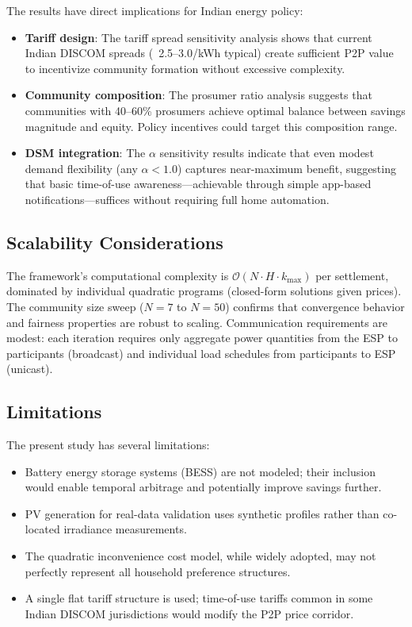 \documentclass[pdflatex,sn-mathphys-num]{sn-jnl}
\newcommand{\rupee}{\text{Rs.}}
\theoremstyle{thmstyleone}
\theoremstyle{thmstyletwo}
\begin{document}
The results have direct implications for Indian energy policy:
\begin{itemize}
    \item \textbf{Tariff design}: The tariff spread sensitivity analysis shows that current Indian DISCOM spreads (\rupee~2.5--3.0/kWh typical) create sufficient P2P value to incentivize community formation without excessive complexity.
    \item \textbf{Community composition}: The prosumer ratio analysis suggests that communities with 40--60\% prosumers achieve optimal balance between savings magnitude and equity. Policy incentives could target this composition range.
    \item \textbf{DSM integration}: The $\alpha$ sensitivity results indicate that even modest demand flexibility (any $\alpha < 1.0$) captures near-maximum benefit, suggesting that basic time-of-use awareness---achievable through simple app-based notifications---suffices without requiring full home automation.
\end{itemize}

\subsection{Scalability Considerations}

The framework's computational complexity is $\mathcal{O}(N \cdot H \cdot k_{\max})$ per settlement, dominated by individual quadratic programs (closed-form solutions given prices). The community size sweep ($N=7$ to $N=50$) confirms that convergence behavior and fairness properties are robust to scaling. Communication requirements are modest: each iteration requires only aggregate power quantities from the ESP to participants (broadcast) and individual load schedules from participants to ESP (unicast).

\subsection{Limitations}

The present study has several limitations:
\begin{itemize}
    \item Battery energy storage systems (BESS) are not modeled; their inclusion would enable temporal arbitrage and potentially improve savings further.
    \item PV generation for real-data validation uses synthetic profiles rather than co-located irradiance measurements.
    \item The quadratic inconvenience cost model, while widely adopted, may not perfectly represent all household preference structures.
    \item A single flat tariff structure is used; time-of-use tariffs common in some Indian DISCOM jurisdictions would modify the P2P price corridor.
\end{itemize}
\end{document}
